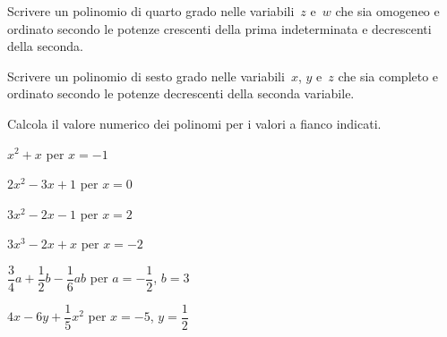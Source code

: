 \begin{multicols}{2}
\begin{esercizio}
\label{ese:10.9}
Scrivere un polinomio di quarto grado nelle variabili~\(z\) e~\(w\) che sia omogeneo 
e ordinato secondo le
potenze crescenti della prima indeterminata e decrescenti della seconda.
\end{esercizio}

\begin{esercizio}
\label{ese:10.10}
Scrivere un polinomio di sesto grado nelle variabili~\(x\), \(y\) e~\(z\) che sia 
completo e ordinato secondo le
potenze decrescenti della seconda variabile.
\end{esercizio}

\begin{esercizio}
\label{ese:10.11}
Calcola il valore numerico dei polinomi per i valori a fianco indicati.

\begin{enumeratea}
\item \(x^2+x\) per \(x=-1\)
\item \(2x^2-3x+1\) per \(x=0\)
\item \(3x^2-2x-1\) per \(x=2\)
\item \(3x^3-2x+x\) per \(x=-2\)
\item \(\dfrac{3}{4}a+\dfrac{1}{2}b-\dfrac{1}{6}ab\) per \(a=-\dfrac{1}{2}\), \(b=3\)
\item \(4x-6y+\dfrac{1}{5}x^2\) per \(x=-5\), \(y=\dfrac{1}{2}\)
\end{enumeratea}
\end{esercizio}
\end{multicols}

\subsubsection*{}

